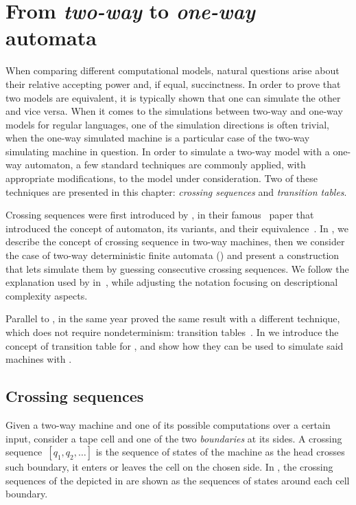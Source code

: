 \chapter{From \emph{two-way} to \emph{one-way} automata}\label{ch:techniques}
When comparing different computational models, natural questions arise about their relative accepting power and, if equal, succinctness.
In order to prove that two models are equivalent, it is typically shown that one can simulate the other and vice versa.
When it comes to the simulations between two-way and one-way models for regular languages, one of the simulation directions is often trivial, when the one-way simulated machine is a particular case of the two-way simulating machine in question.
In order to simulate a two-way model with a one-way automaton, a few standard techniques are commonly applied, with appropriate modifications, to the model under consideration.
Two of these techniques are presented in this chapter: \emph{crossing sequences} and \emph{transition tables}.

Crossing sequences were first introduced by \citeauthor{RabSco59}, in their famous~\citeyear{RabSco59} paper that introduced the concept of automaton, its variants, and their equivalence~\cite{RabSco59}.
In , we describe the concept of crossing sequence in two-way machines, then we consider the case of two-way deterministic finite automata (\TDFAs) and present a construction that lets \ONFAs simulate them by guessing consecutive crossing sequences.
We follow the explanation used by \citeauthor{HopUll79} in~\cite{HopUll79}, while adjusting the notation focusing on descriptional complexity aspects.

Parallel to \citeauthor{RabSco59}, in the same year \citeauthor{She59} proved the same result with a different technique, which does not require nondeterminism: transition tables~\cite{She59}.
In  we introduce the concept of transition table for \TDFAs, and show how they can be used to simulate said machines with \ODFAs.


\section{Crossing sequences}\label{sec:crossseq2DFA}
Given a two-way machine and one of its possible computations over a certain input, consider a tape cell and one of the two \emph{boundaries} at its sides.
A crossing sequence~$[q_1,q_2,\dots]$ is the sequence of states of the machine as the head crosses such boundary, \ie it enters or leaves the cell on the chosen side.
In , the crossing sequences of the \TDFA depicted in  are shown as the sequences of states around each cell boundary.

